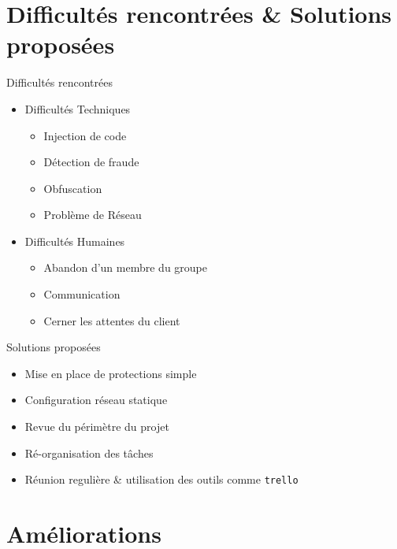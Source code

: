 \documentclass{cubeamer}
\begin{document}
\section{Difficultés rencontrées \& Solutions proposées}

\begin{frame}{Difficultés rencontrées}
    \begin{itemize}
        \item Difficultés Techniques 
              \begin{itemize}
                \item Injection de code
                \item Détection de fraude
                \item Obfuscation
                \item Problème de Réseau
              \end{itemize}
        \item Difficultés Humaines
              \begin{itemize}
                \item Abandon d'un membre du groupe
                \item Communication
                \item Cerner les attentes du client
              \end{itemize}
    \end{itemize}
\end{frame}

\begin{frame}{Solutions proposées}
    \begin{itemize}
        \item Mise en place de protections simple
        \item Configuration réseau statique
        \item Revue du périmètre du projet
        \item Ré-organisation des tâches
        \item Réunion regulière \& utilisation des outils comme \verb:trello:
    \end{itemize}
\end{frame}

\section{Améliorations}
\end{document}

